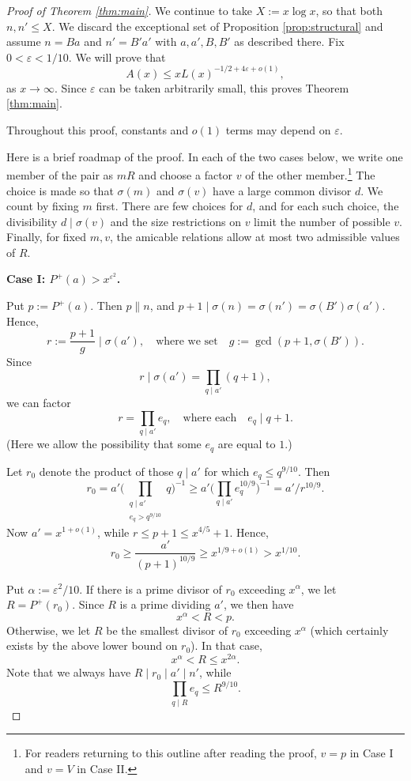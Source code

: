 \documentclass[11pt]{amsart}
\begin{document}
\begin{proof}[Proof of Theorem \ref{thm:main}]
We continue to take $X:=x\log x$, so that both $n,n'\le X$. We discard the exceptional set of Proposition \ref{prop:structural} and assume $n=Ba$ and $n'=B'a'$ with $a,a', B, B'$ as described there. Fix $0<\varepsilon<1/10$. We will prove that
\[
 A(x)\le xL(x)^{-1/2+4\varepsilon+o(1)}, 
\]
as $x\to\infty$. Since $\varepsilon$ can be taken arbitrarily small, this proves Theorem \ref{thm:main}. 

Throughout this proof, constants and $o(1)$ terms may depend on $\varepsilon$.

Here is a brief roadmap of the proof. In each of the two cases below, we write one member of the pair as $mR$ and
choose a factor $v$ of the other member.\footnote{For readers
returning to this outline after reading the proof, $v=p$ in
Case I and $v=V$ in Case II.}
The choice is made so that $\sigma(m)$ and $\sigma(v)$ have
a large common divisor $d$. We count by fixing $m$ first.
There are few choices for $d$, and for each such choice,
the divisibility $d\mid\sigma(v)$ and the size restrictions
on $v$ limit the number of possible $v$. Finally, for fixed
$m,v$, the amicable relations allow at most two admissible
values of $R$.

\medskip
{}
\noindent\textbf{Case I: $P^{+}(a)>x^{\varepsilon^2}$.}

Put $p:=P^{+}(a)$. Then $p\parallel n$, and $p+1 \mid \sigma(n) = \sigma(n') = \sigma(B') \sigma(a')$. Hence, 
\[ r:= \frac{p+1}{g} \mid \sigma(a'), \quad\text{where we set}\quad g:=\gcd(p+1,\sigma(B')).\]
Since 
\[ r \mid \sigma(a') = \prod_{q \mid a'} (q+1), \]
we can factor
\[ r = \prod_{q \mid a'} e_q, \quad\text{where each}\quad e_q \mid q+1.\]
(Here we allow the possibility that some $e_q$ are equal to $1$.)

Let $r_0$ denote the product of those $q \mid a'$ for which $e_q \le q^{9/10}$. Then 
\[ r_0 = a' \Bigg(\prod_{\substack{q\mid a' \\ e_q > q^{9/10}}} q\Bigg)^{-1} \ge a' \Bigg(\prod_{q\mid a'} e_q^{10/9}\Bigg)^{-1} = a'/r^{10/9}.\]
Now $a'=x^{1+o(1)}$, while $r\le p+1\le x^{4/5}+1$. Hence,
\[ r_0\ge\frac{a'}{(p+1)^{10/9}}\ge x^{1/9+o(1)}>x^{1/10}.\]

Put $\alpha:=\varepsilon^2/10$. If there is a prime divisor of $r_0$ exceeding $x^\alpha$, we let $R = P^{+}(r_0)$. Since $R$ is a prime dividing $a'$, we then have
\[ x^{\alpha} < R < p.
\]
Otherwise, we let $R$ be the smallest divisor of $r_0$ exceeding $x^{\alpha}$ (which certainly exists by the above lower bound on $r_0$). In that case, 
\[ x^{\alpha} < R \le x^{2\alpha}.\]
Note that we always have $R \mid r_0 \mid a'\mid n'$, while 
\[ \prod_{q\mid R} e_q \le R^{9/10}.\] 



\end{proof}
\end{document}
